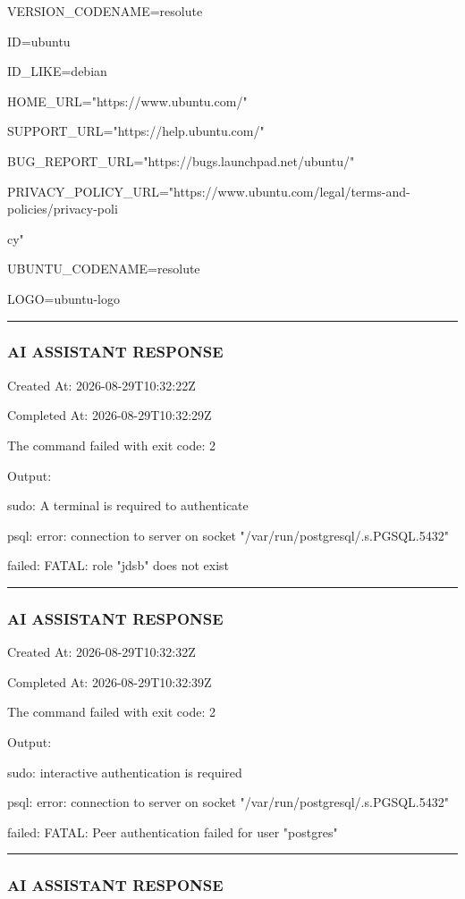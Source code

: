 \documentclass[11pt,a4paper]{article}
\begin{document}
VERSION\_CODENAME=resolute

ID=ubuntu

ID\_LIKE=debian

HOME\_URL="https://www.ubuntu.com/"

SUPPORT\_URL="https://help.ubuntu.com/"

BUG\_REPORT\_URL="https://bugs.launchpad.net/ubuntu/"

PRIVACY\_POLICY\_URL="https://www.ubuntu.com/legal/terms-and-policies/privacy-poli

cy"

UBUNTU\_CODENAME=resolute

LOGO=ubuntu-logo


\hrule

\subsubsection{AI ASSISTANT RESPONSE}

Created At: 2026-08-29T10:32:22Z

Completed At: 2026-08-29T10:32:29Z


The command failed with exit code: 2

Output:

sudo: A terminal is required to authenticate

psql: error: connection to server on socket "/var/run/postgresql/.s.PGSQL.5432"

failed: FATAL:  role "jdsb" does not exist


\hrule

\subsubsection{AI ASSISTANT RESPONSE}

Created At: 2026-08-29T10:32:32Z

Completed At: 2026-08-29T10:32:39Z


The command failed with exit code: 2

Output:

sudo: interactive authentication is required

psql: error: connection to server on socket "/var/run/postgresql/.s.PGSQL.5432"

failed: FATAL:  Peer authentication failed for user "postgres"


\hrule

\subsubsection{AI ASSISTANT RESPONSE}
\end{document}
